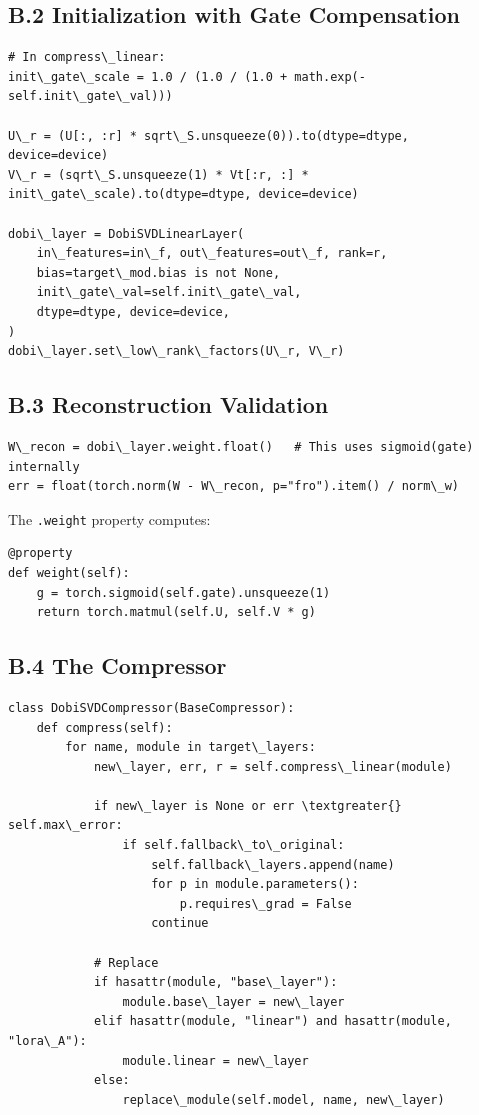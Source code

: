 \subsection{B.2 Initialization with Gate Compensation}

\begin{lstlisting}
# In compress\_linear:
init\_gate\_scale = 1.0 / (1.0 / (1.0 + math.exp(-self.init\_gate\_val)))

U\_r = (U[:, :r] * sqrt\_S.unsqueeze(0)).to(dtype=dtype, device=device)
V\_r = (sqrt\_S.unsqueeze(1) * Vt[:r, :] * init\_gate\_scale).to(dtype=dtype, device=device)

dobi\_layer = DobiSVDLinearLayer(
    in\_features=in\_f, out\_features=out\_f, rank=r,
    bias=target\_mod.bias is not None,
    init\_gate\_val=self.init\_gate\_val,
    dtype=dtype, device=device,
)
dobi\_layer.set\_low\_rank\_factors(U\_r, V\_r)
\end{lstlisting}

\subsection{B.3 Reconstruction Validation}

\begin{lstlisting}
W\_recon = dobi\_layer.weight.float()   # This uses sigmoid(gate) internally
err = float(torch.norm(W - W\_recon, p="fro").item() / norm\_w)
\end{lstlisting}

The \texttt{.weight} property computes:

\begin{lstlisting}
@property
def weight(self):
    g = torch.sigmoid(self.gate).unsqueeze(1)
    return torch.matmul(self.U, self.V * g)
\end{lstlisting}

\subsection{B.4 The Compressor}

\begin{lstlisting}
class DobiSVDCompressor(BaseCompressor):
    def compress(self):
        for name, module in target\_layers:
            new\_layer, err, r = self.compress\_linear(module)
            
            if new\_layer is None or err \textgreater{} self.max\_error:
                if self.fallback\_to\_original:
                    self.fallback\_layers.append(name)
                    for p in module.parameters():
                        p.requires\_grad = False
                    continue
            
            # Replace
            if hasattr(module, "base\_layer"):
                module.base\_layer = new\_layer
            elif hasattr(module, "linear") and hasattr(module, "lora\_A"):
                module.linear = new\_layer
            else:
                replace\_module(self.model, name, new\_layer)
\end{lstlisting}


